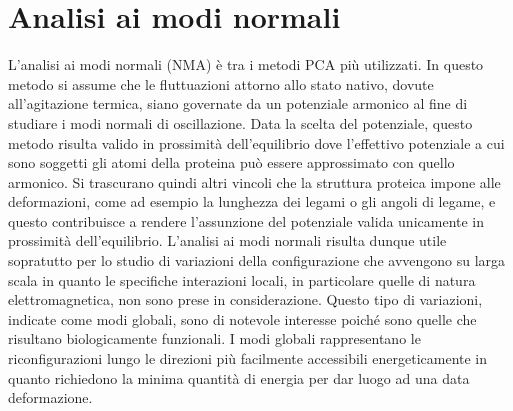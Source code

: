 \section{Analisi ai modi normali}
L'analisi ai modi normali (NMA) è tra i metodi PCA più utilizzati. 
In questo metodo si assume che le fluttuazioni attorno allo stato nativo, dovute all'agitazione termica, siano governate da un potenziale armonico al fine di studiare i modi normali di oscillazione. Data la scelta del potenziale, questo metodo risulta valido in prossimità dell'equilibrio dove l'effettivo potenziale a cui sono soggetti gli atomi della proteina può essere approssimato con quello armonico. Si trascurano quindi altri vincoli che la struttura proteica impone alle deformazioni, come ad esempio la lunghezza dei legami o gli angoli di legame, e questo contribuisce a rendere l'assunzione del potenziale valida unicamente in prossimità dell'equilibrio. 
L'analisi ai modi normali risulta dunque utile sopratutto per lo studio di variazioni della configurazione che avvengono su larga scala in quanto le specifiche interazioni locali, in particolare quelle di natura elettromagnetica, non sono prese in considerazione.
Questo tipo di variazioni, indicate come modi globali, sono di notevole interesse poiché sono quelle che risultano biologicamente funzionali. I modi globali rappresentano le riconfigurazioni lungo le direzioni più facilmente accessibili energeticamente in quanto richiedono la minima quantità di energia per dar luogo ad una data deformazione. \cite{chem_rev}

